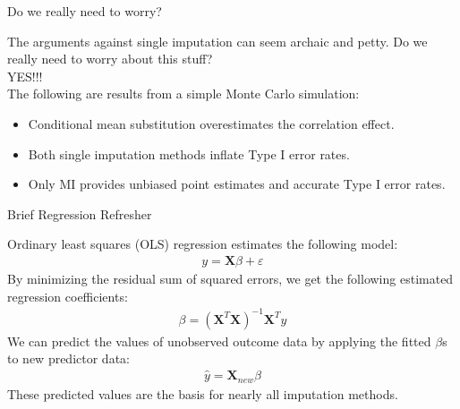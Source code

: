 \documentclass[table]{beamer}
\begin{document}
\begin{frame}[shrink = 5]{Do we really need to worry?}

  The arguments against single imputation can seem archaic and
  petty. Do we really need to worry about this stuff?\\  
  \pause
  \vspace{12pt}
  YES!!!\\
  \vspace{12pt}
  The following are results from a simple Monte Carlo simulation:
  


\pause
\vspace{-12pt}
\begin{itemize}
\item Conditional mean substitution overestimates the correlation
  effect.
  \vspace{6pt}
\item Both single imputation methods inflate Type I error rates.
  \vspace{6pt}
\item Only MI provides unbiased point estimates and accurate Type I
  error rates.
\end{itemize}

\end{frame}


\begin{frame}{Brief Regression Refresher}
  
  Ordinary least squares (OLS) regression estimates the following
  model:
  \begin{align}
    y = \mathbf{X}\beta + \varepsilon
  \end{align}
  By minimizing the residual sum of squared errors, we get the
  following estimated regression coefficients:
  \begin{align}
     \beta = \left(\mathbf{X}^T \mathbf{X} \right)^{-1} \mathbf{X}^T y
  \end{align}
  We can predict the values of unobserved outcome data by applying the
  fitted $\beta$s to new predictor data:
  \begin{align}
    \hat{y} = \mathbf{X}_{new}\beta
  \end{align}
  These predicted values are the basis for nearly all imputation methods.
  
\end{frame}
\end{document}
